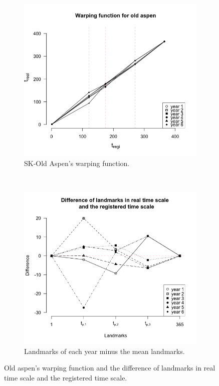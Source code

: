 \documentclass{article}
\begin{document}
\begin{figure}[!ht]
    \centering
    \begin{subfigure}[ht]{0.45\textwidth}
        \includegraphics[width=\textwidth]{WarppingOAP4.png}
        \caption{SK-Old Aspen's warping function.}\label{Fig:warpOAP}
    \end{subfigure}
     ~
      \begin{subfigure}[ht]{0.45\textwidth}
        \includegraphics[width=\textwidth]{LandmarkDiff3.png}
        \caption{Landmarks of each year minus the mean landmarks.}\label{Fig:warpDiff}
     \end{subfigure}
    \caption{Old aspen's warping function and the difference of landmarks in real time scale and the registered time scale.}\label{Fig:warping}
\end{figure}
\end{document}
